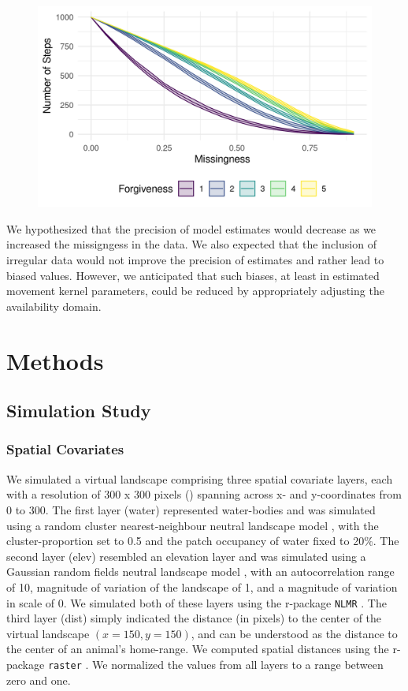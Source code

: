 \documentclass[abstract=on,10pt,a4paper,bibliography=totocnumbered]{article}
\begin{document}
\begin{figure}
  \begin{center}
  \includegraphics[width = \textwidth]{99_NumberOfSteps.png}
  \caption{}
  \label{Covariates}
  \end{center}
\end{figure}

We hypothesized that the precision of model estimates would decrease as we
increased the missigngess in the data. We also expected that the inclusion of
irregular data would not improve the precision of estimates and rather lead to
biased values. However, we anticipated that such biases, at least in estimated
movement kernel parameters, could be reduced by appropriately adjusting the
availability domain.

\section{Methods}
\subsection{Simulation Study}
\subsubsection{Spatial Covariates}
We simulated a virtual landscape comprising three spatial covariate layers, each
with a resolution of 300 x 300 pixels () spanning across x- and
y-coordinates from 0 to 300. The first layer (\textsf{water}) represented
water-bodies and was simulated using a random cluster nearest‐neighbour neutral
landscape model \citep{Saura.2000}, with the cluster-proportion set to 0.5 and
the patch occupancy of water fixed to 20\%. The second layer (\textsf{elev})
resembled an elevation layer and was simulated using a Gaussian random fields
neutral landscape model \citep{Schlather.2015}, with an autocorrelation range of
10, magnitude of variation of the landscape of 1, and a magnitude of variation
in scale of 0. We simulated both of these layers using the r-package {\tt NLMR}
\citep{Sciaini.2018}. The third layer (\textsf{dist}) simply indicated the
distance (in pixels) to the center of the virtual landscape \((x = 150, y =
150)\), and can be understood as the distance to the center of an animal's
home-range. We computed spatial distances using the r-package {\tt raster}
\citep{Hijmans.2022}. We normalized the values from all layers to a range
between zero and one.
\end{document}
